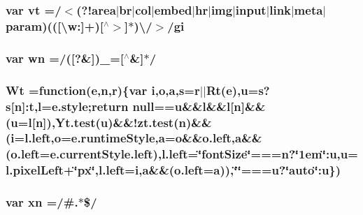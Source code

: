 \hypertarget{jquery-1_89_81_8min_8js_adc4a0893e61d21054bf10d67f5e69aad}{
\subsubsection[{vt}]{\setlength{\rightskip}{0pt plus 5cm}var vt =/$<$(?!area$\vert$br$\vert$col$\vert$embed$\vert$hr$\vert$img$\vert$input$\vert$link$\vert$meta$\vert${\bf param})((\mbox{[}\textbackslash{}w\-:\mbox{]}+)\mbox{[}$^\wedge$$>$\mbox{]}$\ast$)\textbackslash{}/$>$/gi}}\label{jquery-1_89_81_8min_8js_adc4a0893e61d21054bf10d67f5e69aad}
\hypertarget{jquery-1_89_81_8min_8js_aaa87ec69cc4d144180280e906cac73f1}{
\subsubsection[{wn}]{\setlength{\rightskip}{0pt plus 5cm}var wn =/(\mbox{[}?\&\mbox{]})\-\_\-=\mbox{[}$^\wedge$\&\mbox{]}$\ast$/}}\label{jquery-1_89_81_8min_8js_aaa87ec69cc4d144180280e906cac73f1}
\hypertarget{jquery-1_89_81_8min_8js_acf437e7551a2ce881d7ec2b66e46dc17}{
\subsubsection[{Wt}]{\setlength{\rightskip}{0pt plus 5cm}Wt =function({\bf e},{\bf n},{\bf r})\{var {\bf i},{\bf o},{\bf a},{\bf s}={\bf r}$\vert$$\vert${\bf Rt}({\bf e}),{\bf u}={\bf s}?{\bf s}\mbox{[}{\bf n}\mbox{]}\-:{\bf t},{\bf l}=e.\-style;return null=={\bf u}\&\&{\bf l}\&\&{\bf l}\mbox{[}{\bf n}\mbox{]}\&\&({\bf u}={\bf l}\mbox{[}{\bf n}\mbox{]}),Yt.\-test({\bf u})\&\&!zt.\-test({\bf n})\&\&({\bf i}=l.\-left,{\bf o}=e.\-runtime\-Style,{\bf a}={\bf o}\&\&o.\-left,{\bf a}\&\&(o.\-left=e.\-current\-Style.\-left),l.\-left=\char`\"{}font\-Size\char`\"{}===n?\char`\"{}1em\char`\"{}\-:u,u=l.\-pixel\-Left+\char`\"{}px\char`\"{},l.\-left=i,a\&\&(o.\-left=a)),\char`\"{}\char`\"{}===u?\char`\"{}auto\char`\"{}\-:u\})}}\label{jquery-1_89_81_8min_8js_acf437e7551a2ce881d7ec2b66e46dc17}
\hypertarget{jquery-1_89_81_8min_8js_a5d600963c6441f15f548bc0b847b6a04}{
\subsubsection[{xn}]{\setlength{\rightskip}{0pt plus 5cm}var xn =/\#.$\ast$\$/}}\label{jquery-1_89_81_8min_8js_a5d600963c6441f15f548bc0b847b6a04}
